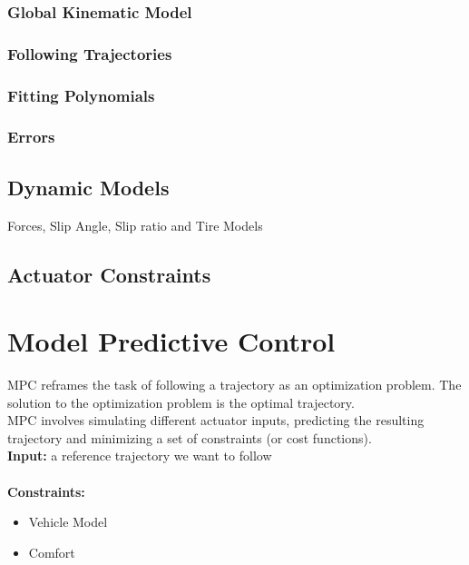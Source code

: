 \documentclass[11pt]{article}
\begin{document}
\subsubsection{Global Kinematic Model}

\subsubsection{Following Trajectories}

\subsubsection{Fitting Polynomials}

\subsubsection{Errors}

\subsection{Dynamic Models}


Forces, Slip Angle, Slip ratio and Tire Models


\subsection{Actuator Constraints}

\section{Model Predictive Control}

MPC reframes the task of following a trajectory as an optimization problem. The solution to the optimization problem is the optimal trajectory. \\

MPC involves simulating different actuator inputs, predicting the resulting trajectory and minimizing a set of constraints (or cost functions). \\ 

\textbf{Input:} a reference trajectory we want to follow \\ \\
\textbf{Constraints:}
\begin{itemize}
\item Vehicle Model
\item Comfort
\end{itemize}
\end{document}
